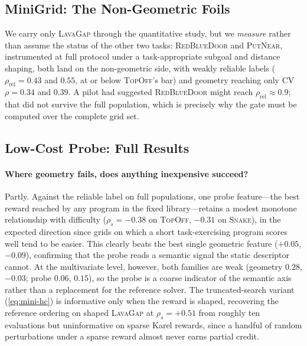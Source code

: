 \documentclass[twoside]{article}
\begin{document}
\subsection{MiniGrid: The Non-Geometric Foils}
\label{app:foils}
We carry only \textsc{LavaGap} through the quantitative study, but we \emph{measure} rather than assume the status of the other two tasks: \textsc{RedBlueDoor} and \textsc{PutNear}, instrumented at full protocol under a task-appropriate subgoal and distance shaping, both land on the non-geometric side, with weakly reliable labels ($\rho_{\mathrm{rel}} = 0.43$ and $0.55$, at or below \textsc{TopOff}'s bar) and geometry reaching only CV $\rho = 0.34$ and $0.39$. A pilot had suggested \textsc{RedBlueDoor} might reach $\rho_{\mathrm{rel}} \approx 0.9$; that did not survive the full population, which is precisely why the gate must be computed over the complete grid set.

\subsection{Low-Cost Probe: Full Results}
\paragraph{Where geometry fails, does anything inexpensive succeed?}
\label{sec:results-mini-hc}
Partly. Against the reliable label on full populations, one probe feature---the best reward reached by any program in the fixed library---retains a modest monotone relationship with difficulty ($\rho_s = -0.38$ on \textsc{TopOff}, $-0.31$ on \textsc{Snake}), in the expected direction since grids on which a short task-exercising program scores well tend to be easier. This clearly beats the best single geometric feature ($+0.05$, $-0.09$), confirming that the probe reads a semantic signal the static descriptor cannot. At the multivariate level, however, both families are weak (geometry $0.28$, $-0.03$; probe $0.06$, $0.15$), so the probe is a coarse indicator of the semantic axis rather than a replacement for the reference solver. The truncated-search variant (\ref{eq:mini-hc}) is informative only when the reward is shaped, recovering the reference ordering on shaped \textsc{LavaGap} at $\rho_s = +0.51$ from roughly ten evaluations but uninformative on sparse Karel rewards, since a handful of random perturbations under a sparse reward almost never earns partial credit.
\end{document}
